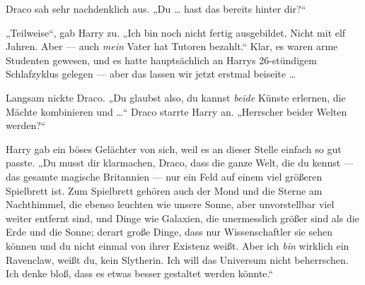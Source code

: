 Draco sah sehr nachdenklich aus.
„Du … hast das bereits hinter dir?“

„Teilweise“, gab Harry zu.
„Ich bin noch nicht fertig ausgebildet. Nicht mit elf Jahren. Aber — auch \emph{mein} Vater hat Tutoren bezahlt.“ Klar, es waren arme Studenten gewesen, und es hatte hauptsächlich an Harrys 26-stündigem Schlafzyklus gelegen — aber das lassen wir jetzt erstmal beiseite …

Langsam nickte Draco.
„Du glaubst also, du kannst \emph{beide} Künste erlernen, die Mächte kombinieren und …“ Draco starrte Harry an.
„Herrscher beider Welten werden?“

Harry gab ein böses Gelächter von sich, weil es an dieser Stelle einfach so gut passte.
„Du musst dir klarmachen, Draco, dass die ganze Welt, die du kennst — das gesamte magische Britannien — nur ein Feld auf einem viel größeren Spielbrett ist. Zum Spielbrett gehören auch der Mond und die Sterne am Nachthimmel, die ebenso leuchten wie unsere Sonne, aber unvorstellbar viel weiter entfernt sind, und Dinge wie Galaxien, die unermesslich größer sind als die Erde und die Sonne; derart große Dinge, dass nur Wissenschaftler sie sehen können und du nicht einmal von ihrer Existenz weißt. Aber ich \emph{bin} wirklich ein Ravenclaw, weißt du, kein Slytherin. Ich will das Universum nicht beherrschen. Ich denke bloß, dass es etwas besser gestaltet werden könnte.“

